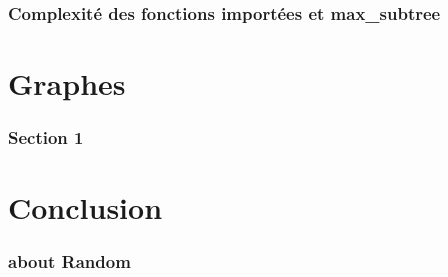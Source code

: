 \documentclass[a4paper]{report}
\begin{document}
\section{Complexité des fonctions importées et max\_subtree}
\part{Graphes}
\section{Section 1}
\part{Conclusion}
\section{about Random}



\end{document}
